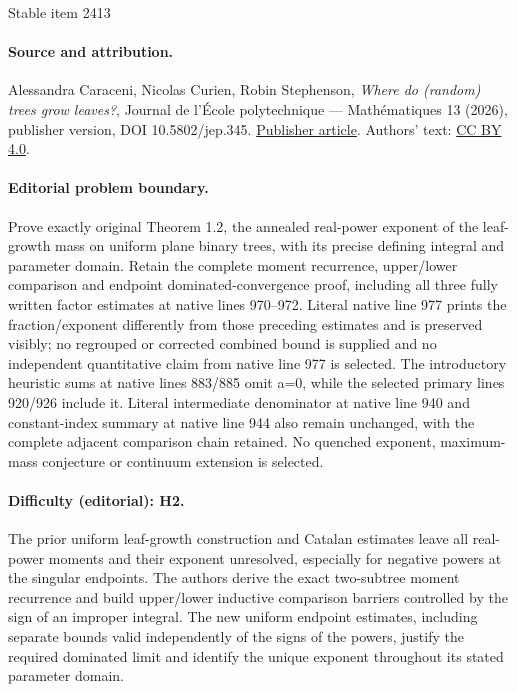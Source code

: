 \documentclass[11pt]{article}
\theoremstyle{definition}
\begin{document}
\begin{center}{\Large Stable item 2413}\end{center}
\paragraph{Source and attribution.}
Alessandra Caraceni, Nicolas Curien, Robin Stephenson, \emph{Where do (random) trees grow leaves?}, Journal de l’École polytechnique — Mathématiques 13 (2026), publisher version, DOI 10.5802/jep.345. \href{https://jep.centre-mersenne.org/articles/10.5802/jep.345/}{Publisher article}. Authors' text: \href{https://creativecommons.org/licenses/by/4.0/}{CC BY 4.0}.
\paragraph{Editorial problem boundary.}
Prove exactly original Theorem 1.2, the annealed real-power exponent of the leaf-growth mass on uniform plane binary trees, with its precise defining integral and parameter domain. Retain the complete moment recurrence, upper/lower comparison and endpoint dominated-convergence proof, including all three fully written factor estimates at native lines 970--972. Literal native line 977 prints the fraction/exponent differently from those preceding estimates and is preserved visibly; no regrouped or corrected combined bound is supplied and no independent quantitative claim from native line 977 is selected. The introductory heuristic sums at native lines 883/885 omit a=0, while the selected primary lines 920/926 include it. Literal intermediate denominator at native line 940 and constant-index summary at native line 944 also remain unchanged, with the complete adjacent comparison chain retained. No quenched exponent, maximum-mass conjecture or continuum extension is selected.
\paragraph{Difficulty (editorial): H2.}
The prior uniform leaf-growth construction and Catalan estimates leave all real-power moments and their exponent unresolved, especially for negative powers at the singular endpoints. The authors derive the exact two-subtree moment recurrence and build upper/lower inductive comparison barriers controlled by the sign of an improper integral. The new uniform endpoint estimates, including separate bounds valid independently of the signs of the powers, justify the required dominated limit and identify the unique exponent throughout its stated parameter domain.
\end{document}
